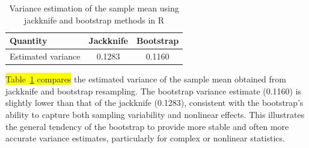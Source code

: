 \documentclass[aodsor,preprint]{imsart}
\numberwithin{equation}{section}
\theoremstyle{plain}
\begin{document}
\begin{table}[h!]
\centering
\caption{Variance estimation of the sample mean using jackknife and bootstrap methods in R}
\begin{tabular}{lcc}
\hline
\textbf{Quantity} & \textbf{Jackknife} & \textbf{Bootstrap} \\
\hline
Estimated variance & 0.1283 & 0.1160 \\
\hline
\end{tabular}
\label{tab:variance-comparison}
\end{table}

 \colorbox{yellow}{Table~\ref{tab:variance-comparison} compares} the estimated variance of the sample mean obtained from jackknife and bootstrap resampling. The bootstrap variance estimate (0.1160) is slightly lower than that of the jackknife (0.1283), consistent with the bootstrap’s ability to capture both sampling variability and nonlinear effects. This illustrates the general tendency of the bootstrap to provide more stable and often more accurate variance estimates, particularly for complex or nonlinear statistics.  \\
\end{document}
